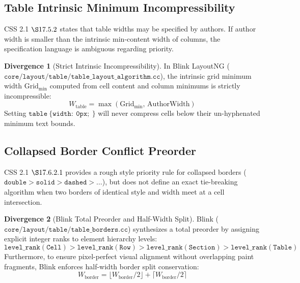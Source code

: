 \documentclass[11pt,a4paper]{article}
\theoremstyle{definition}
\newtheorem{divergence}{Divergence}[section]
\begin{document}
\subsection{Table Intrinsic Minimum Incompressibility}
CSS 2.1 $\S 17.5.2$ states that table widths may be specified by authors. If author width is smaller than the intrinsic min-content width of columns, the specification language is ambiguous regarding priority.

\begin{divergence}[Strict Intrinsic Incompressibility]
In Blink LayoutNG ($\mathtt{core/layout/table/table\_layout\_algorithm.cc}$), the intrinsic grid minimum width $\text{Grid}_{\min}$ computed from cell content and column minimums is strictly incompressible:
\begin{equation}
    W_{\text{table}} = \max\left(\text{Grid}_{\min},\, \text{AuthorWidth}\right)
\end{equation}
Setting $\mathtt{table\ \{ width:\ 0px;\ \}}$ will never compress cells below their un-hyphenated minimum text bounds.
\end{divergence}

\subsection{Collapsed Border Conflict Preorder}
CSS 2.1 $\S 17.6.2.1$ provides a rough style priority rule for collapsed borders ($\mathtt{double} > \mathtt{solid} > \mathtt{dashed} > \dots$), but does not define an exact tie-breaking algorithm when two borders of identical style and width meet at a cell intersection.

\begin{divergence}[Blink Total Preorder and Half-Width Split]
Blink ($\mathtt{core/layout/table/table\_borders.cc}$) synthesizes a total preorder by assigning explicit integer ranks to element hierarchy levels:
\begin{equation}
    \mathtt{level\_rank}(\mathtt{Cell}) > \mathtt{level\_rank}(\mathtt{Row}) > \mathtt{level\_rank}(\mathtt{Section}) > \mathtt{level\_rank}(\mathtt{Table})
\end{equation}
Furthermore, to ensure pixel-perfect visual alignment without overlapping paint fragments, Blink enforces half-width border split conservation:
\begin{equation}
    W_{\text{border}} = \lfloor W_{\text{border}} / 2 \rfloor + \lceil W_{\text{border}} / 2 \rceil
\end{equation}
\end{divergence}
\end{document}

